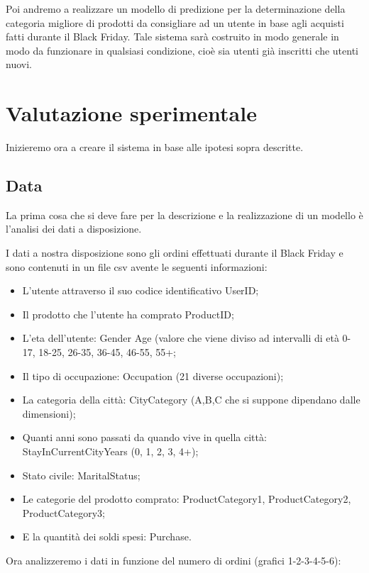 \documentclass{article}
\begin{document}
Poi andremo a realizzare un modello di predizione per la determinazione della categoria migliore di prodotti da consigliare ad un utente in base agli acquisti fatti durante il Black Friday. Tale sistema sarà costruito in modo generale in modo da funzionare in qualsiasi condizione, cioè sia utenti già inscritti che utenti nuovi.

\section{Valutazione sperimentale}
Inizieremo ora a creare il sistema in base alle ipotesi sopra descritte.

\subsection{Data}
La prima cosa che si deve fare per la descrizione e la realizzazione di un modello è l'analisi dei dati a disposizione.

I dati a nostra disposizione sono gli ordini effettuati durante il Black Friday e sono contenuti in un file csv avente le seguenti informazioni:
\begin{itemize}
\item L'utente attraverso il suo codice identificativo UserID;
\item Il prodotto che l'utente ha comprato ProductID;
\item L'eta dell'utente: Gender Age (valore che viene diviso ad intervalli di età 0-17, 18-25, 26-35, 36-45, 46-55, 55+;
\item Il tipo di occupazione: Occupation (21 diverse occupazioni);
\item La categoria della città:  CityCategory (A,B,C che si suppone dipendano dalle dimensioni);
\item Quanti anni sono passati da quando vive in quella città: StayInCurrentCityYears (0, 1, 2, 3, 4+);
\item Stato civile: MaritalStatus;
\item Le categorie del prodotto comprato: ProductCategory1, ProductCategory2, ProductCategory3;
\item E la quantità dei soldi spesi: Purchase.
\end{itemize}

Ora analizzeremo i dati in funzione del numero di ordini (grafici 1-2-3-4-5-6):
\end{document}
